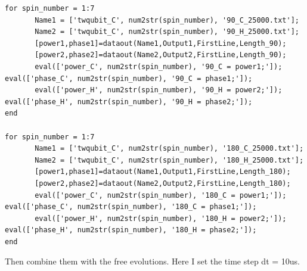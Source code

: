 \documentclass[prl,onecolumn]{revtex4-1}
\begin{document}
\begin{lstlisting}
for spin_number = 1:7
       Name1 = ['twqubit_C', num2str(spin_number), '90_C_25000.txt'];
       Name2 = ['twqubit_C', num2str(spin_number), '90_H_25000.txt'];
       [power1,phase1]=dataout(Name1,Output1,FirstLine,Length_90);
       [power2,phase2]=dataout(Name2,Output2,FirstLine,Length_90);
       eval(['power_C', num2str(spin_number), '90_C = power1;']); eval(['phase_C', num2str(spin_number), '90_C = phase1;']);
       eval(['power_H', num2str(spin_number), '90_H = power2;']); eval(['phase_H', num2str(spin_number), '90_H = phase2;']);
end

for spin_number = 1:7
       Name1 = ['twqubit_C', num2str(spin_number), '180_C_25000.txt'];
       Name2 = ['twqubit_C', num2str(spin_number), '180_H_25000.txt'];
       [power1,phase1]=dataout(Name1,Output1,FirstLine,Length_180);
       [power2,phase2]=dataout(Name2,Output2,FirstLine,Length_180);
       eval(['power_C', num2str(spin_number), '180_C = power1;']); eval(['phase_C', num2str(spin_number), '180_C = phase1;']);
       eval(['power_H', num2str(spin_number), '180_H = power2;']); eval(['phase_H', num2str(spin_number), '180_H = phase2;']);
end
\end{lstlisting}

Then combine them with the free evolutions. Here I set the time step dt = 10us.
\end{document}
